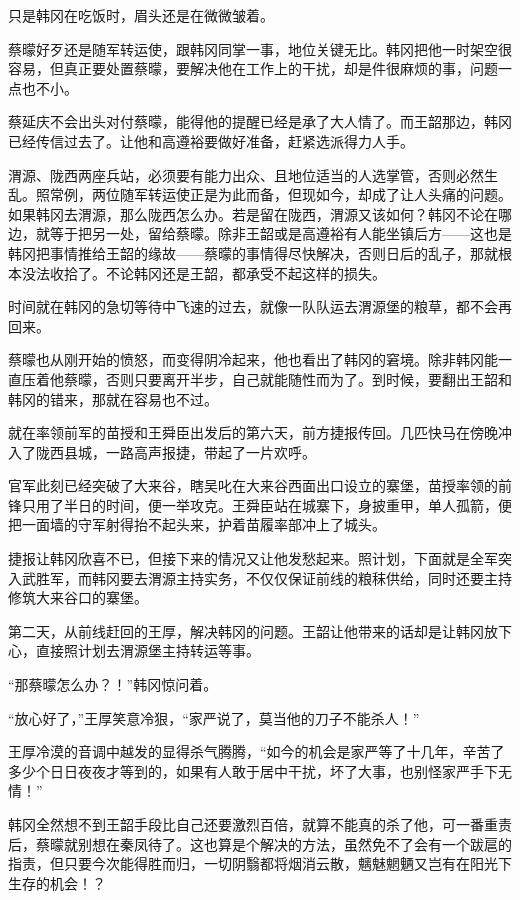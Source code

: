 只是韩冈在吃饭时，眉头还是在微微皱着。

蔡曚好歹还是随军转运使，跟韩冈同掌一事，地位关键无比。韩冈把他一时架空很容易，但真正要处置蔡曚，要解决他在工作上的干扰，却是件很麻烦的事，问题一点也不小。

蔡延庆不会出头对付蔡曚，能得他的提醒已经是承了大人情了。而王韶那边，韩冈已经传信过去了。让他和高遵裕要做好准备，赶紧选派得力人手。

渭源、陇西两座兵站，必须要有能力出众、且地位适当的人选掌管，否则必然生乱。照常例，两位随军转运使正是为此而备，但现如今，却成了让人头痛的问题。如果韩冈去渭源，那么陇西怎么办。若是留在陇西，渭源又该如何？韩冈不论在哪边，就等于把另一处，留给蔡曚。除非王韶或是高遵裕有人能坐镇后方——这也是韩冈把事情推给王韶的缘故——蔡曚的事情得尽快解决，否则日后的乱子，那就根本没法收拾了。不论韩冈还是王韶，都承受不起这样的损失。

时间就在韩冈的急切等待中飞速的过去，就像一队队运去渭源堡的粮草，都不会再回来。

蔡曚也从刚开始的愤怒，而变得阴冷起来，他也看出了韩冈的窘境。除非韩冈能一直压着他蔡曚，否则只要离开半步，自己就能随性而为了。到时候，要翻出王韶和韩冈的错来，那就在容易也不过。

就在率领前军的苗授和王舜臣出发后的第六天，前方捷报传回。几匹快马在傍晚冲入了陇西县城，一路高声报捷，带起了一片欢呼。

官军此刻已经突破了大来谷，瞎吴叱在大来谷西面出口设立的寨堡，苗授率领的前锋只用了半日的时间，便一举攻克。王舜臣站在城寨下，身披重甲，单人孤箭，便把一面墙的守军射得抬不起头来，护着苗履率部冲上了城头。

捷报让韩冈欣喜不已，但接下来的情况又让他发愁起来。照计划，下面就是全军突入武胜军，而韩冈要去渭源主持实务，不仅仅保证前线的粮秣供给，同时还要主持修筑大来谷口的寨堡。

第二天，从前线赶回的王厚，解决韩冈的问题。王韶让他带来的话却是让韩冈放下心，直接照计划去渭源堡主持转运等事。

“那蔡曚怎么办？！”韩冈惊问着。

“放心好了，”王厚笑意冷狠，“家严说了，莫当他的刀子不能杀人！”

王厚冷漠的音调中越发的显得杀气腾腾，“如今的机会是家严等了十几年，辛苦了多少个日日夜夜才等到的，如果有人敢于居中干扰，坏了大事，也别怪家严手下无情！”

韩冈全然想不到王韶手段比自己还要激烈百倍，就算不能真的杀了他，可一番重责后，蔡曚就别想在秦凤待了。这也算是个解决的方法，虽然免不了会有一个跋扈的指责，但只要今次能得胜而归，一切阴翳都将烟消云散，魑魅魍魉又岂有在阳光下生存的机会！？

